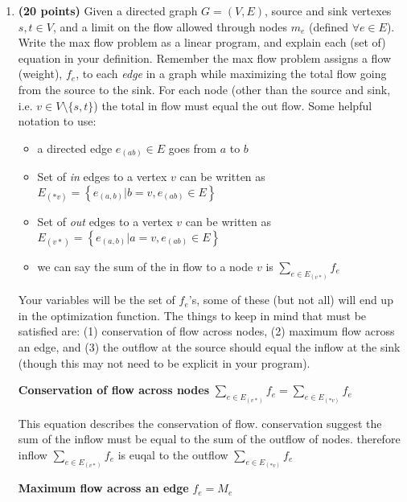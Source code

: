 \documentclass[11pt, oneside]{article}
\begin{document}
\begin{enumerate}
	\item \textbf{(20 points)}
	      Given a directed graph $G = (V,E)$, source and sink vertexes $s,t\in V$, and a limit on the flow allowed through nodes $m_e$ (defined $\forall e\in E$).
	      Write the max flow problem as a linear program, and explain each (set of) equation in your definition.
	      Remember the max flow problem assigns a flow (weight), $f_e$, to each \emph{edge} in a graph
	      while maximizing the total flow going from the source to the sink.
	      For each node (other than the source and sink, i.e. $v\in V\setminus\{s,t\}$)
	      the total in flow must equal the out flow.
	      Some helpful notation to use:
	      \begin{itemize}
		      \item a directed edge $e_{(ab)}\in E$ goes from $a$ to $b$
		      \item Set of \emph{in} edges to a vertex $v$  can be written as $E_{(*v)} = \left\{e_{(a,b)} | b = v,  e_{(ab)}\in E \right\}$
		      \item Set of \emph{out} edges to a vertex $v$  can be written as $E_{(v*)} = \left\{e_{(a,b)} | a = v, e_{(ab)}\in E\right\}$
		      \item we can say the sum of the in flow to a node $v$ is $\displaystyle\sum_{e \in E_{(v*)}} f_e$
	      \end{itemize}
	      Your variables will be the set of $f_e$'s, some of these (but not all) will end up in the optimization function.
	      The things to keep in mind that must be satisfied are:
	      (1) conservation of flow across nodes,
	      (2) maximum flow across an edge, and
	      (3) the outflow at the source should equal the inflow at the sink (though this may not need to be explicit in your program).

	\begin{center}
	\textbf{Conservation of flow across nodes}
	\linebreak
	\linebreak
	$\displaystyle\sum_{e \in E_{(v*)}}f_e = \displaystyle\sum_{e \in E_{(*v)}}f_e$ \end{center}

	This equation describes the conservation of flow. conservation suggest the sum of the inflow must be equal to the sum of the outflow of nodes. therefore inflow $\displaystyle\sum_{e \in E_{(v*)}}f_e$ is euqal to the outflow $\displaystyle\sum_{e \in E_{(*v)}}f_e$
	\pagebreak

	\begin{center}
		\textbf{Maximum flow across an edge}
		\linebreak
		\linebreak
		$f_e = M_e$ 
	\end{center}


\end{enumerate}
\end{document}
